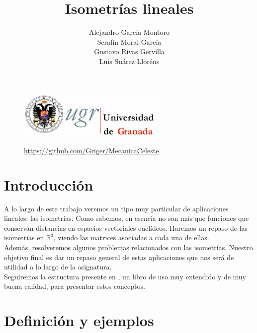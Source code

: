 \documentclass[10pt,a4paper]{article}
\author{Alejandro García Montoro \\ Serafín Moral García \\ Gustavo Rivas Gervilla \\ Luis Suárez Lloréns}
\title{Isometrías lineales}
\date{}
\theoremstyle{mystyle}
\newtheorem{defi}{\textcolor{red}{\textbf{Definición}}}
\begin{document}
\maketitle

\begin{figure}[H]
\centering
\includegraphics[width=70mm]{escudo.jpeg}
\end{figure}

\begin{figure}
\centering
\url{https://github.com/Griger/MecanicaCeleste}
\end{figure}

\newpage

\tableofcontents

\newpage

\section{Introducción}

A lo largo de este trabajo veremos un tipo muy particular de aplicaciones lineales: las isometrías. Como sabemos, en esencia no son más que funciones que conservan distancias en espacios vectoriales euclídeos. Haremos un repaso de las isometrías en $\mathbb{R}^3$, viendo las matrices asociadas a cada una de ellas.\\

Además, resolveremos algunos problemas relacionados con las isometrías. Nuestro objetivo final es dar un repaso general de estas aplicaciones que nos será de utilidad a lo largo de la asignatura.\\

Seguiremos la estructura presente en \cite{merino}, un libro de uso muy extendido y de muy buena calidad, para presentar estos conceptos.
\section{Definición y ejemplos}

\hfill \\
\end{document}
